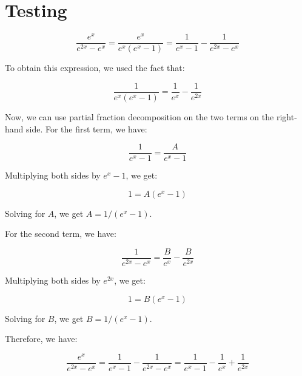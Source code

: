\chapter{Testing}

\begin{equation*}
\frac{e^x}{e^{2x}-e^x}=\frac{e^x}{e^x(e^x-1)}=\frac{1}{e^x-1} - \frac{1}{e^{2x}-e^x}
\end{equation*}

To obtain this expression, we used the fact that:

\begin{equation*}
\frac{1}{e^x(e^x-1)}=\frac{1}{e^x}-\frac{1}{e^{2x}}
\end{equation*}

Now, we can use partial fraction decomposition on the two terms on the right-hand side. For the first term, we have:

\begin{equation*}
\frac{1}{e^x-1}=\frac{A}{e^x-1}
\end{equation*}

Multiplying both sides by $e^x-1$, we get:

\begin{equation*}
1 = A(e^x-1)
\end{equation*}

Solving for $A$, we get $A=1/(e^x-1)$.

For the second term, we have:

\begin{equation*}
\frac{1}{e^{2x}-e^x}=\frac{B}{e^x}-\frac{B}{e^{2x}}
\end{equation*}

Multiplying both sides by $e^{2x}$, we get:

\begin{equation*}
1 = B(e^x - 1)
\end{equation*}

Solving for $B$, we get $B=1/(e^x-1)$.

Therefore, we have:

\begin{equation*}
\frac{e^x}{e^{2x}-e^x}=\frac{1}{e^x-1} - \frac{1}{e^{2x}-e^x}=\frac{1}{e^x-1} - \frac{1}{e^x} + \frac{1}{e^{2x}}
\end{equation*}


